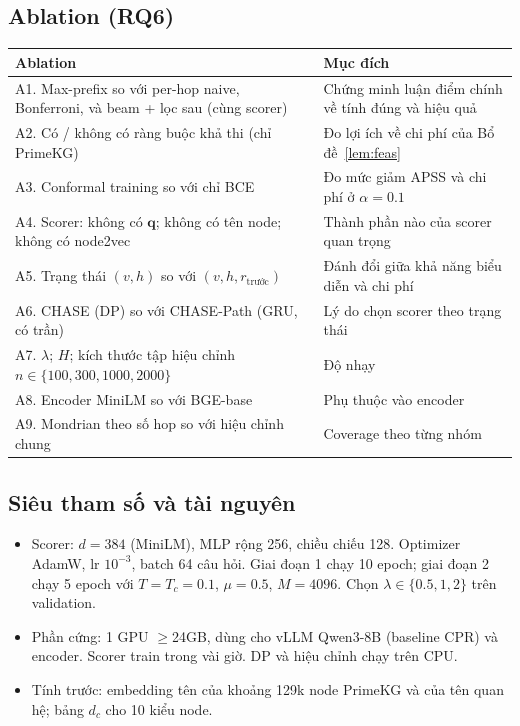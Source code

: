 \documentclass[11pt,a4paper]{article}
\theoremstyle{remark}
\newcommand{\method}{\textsc{CHASE}}
\begin{document}
\subsection{Ablation (RQ6)}
\begin{center}
\small
\begin{tabularx}{\linewidth}{>{\raggedright\arraybackslash}p{4.6cm} >{\raggedright\arraybackslash}X}
\toprule
Ablation & Mục đích \\
\midrule
A1. Max-prefix so với per-hop naive, Bonferroni, và beam + lọc sau (cùng scorer) & Chứng minh luận điểm chính về tính đúng và hiệu quả \\
A2. Có / không có ràng buộc khả thi (chỉ PrimeKG) & Đo lợi ích về chi phí của Bổ đề~\ref{lem:feas} \\
A3. Conformal training so với chỉ BCE & Đo mức giảm APSS và chi phí ở $\alpha=0.1$ \\
A4. Scorer: không có $\mathbf{q}$; không có tên node; không có node2vec & Thành phần nào của scorer quan trọng \\
A5. Trạng thái $(v,h)$ so với $(v,h,r_{\text{trước}})$ & Đánh đổi giữa khả năng biểu diễn và chi phí \\
A6. \method{} (DP) so với \method-Path (GRU, có trần) & Lý do chọn scorer theo trạng thái \\
A7. $\lambda$; $H$; kích thước tập hiệu chỉnh $n\in\{100,300,1000,2000\}$ & Độ nhạy \\
A8. Encoder MiniLM so với BGE-base & Phụ thuộc vào encoder \\
A9. Mondrian theo số hop so với hiệu chỉnh chung & Coverage theo từng nhóm \\
\bottomrule
\end{tabularx}
\end{center}

\subsection{Siêu tham số và tài nguyên}
\begin{itemize}[nosep]
  \item Scorer: $d=384$ (MiniLM), MLP rộng 256, chiều chiếu 128. Optimizer AdamW, lr $10^{-3}$, batch 64 câu hỏi. Giai đoạn 1 chạy 10 epoch; giai đoạn 2 chạy 5 epoch với $T=T_c=0.1$, $\mu=0.5$, $M=4096$. Chọn $\lambda\in\{0.5,1,2\}$ trên validation.
  \item Phần cứng: 1 GPU $\ge$24GB, dùng cho vLLM Qwen3-8B (baseline CPR) và encoder. Scorer train trong vài giờ. DP và hiệu chỉnh chạy trên CPU.
  \item Tính trước: embedding tên của khoảng 129k node PrimeKG và của tên quan hệ; bảng $d_c$ cho 10 kiểu node.
\end{itemize}
\end{document}
